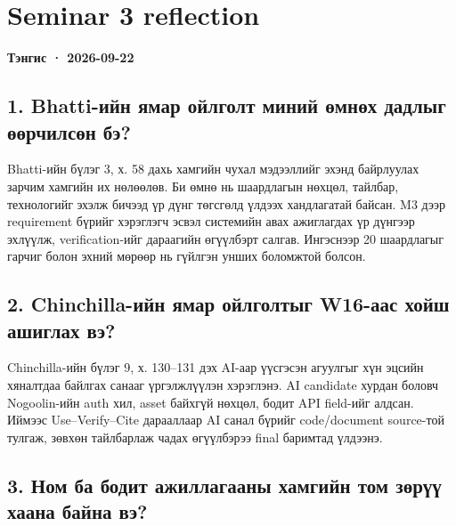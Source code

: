 \documentclass[
  mongolian,
]{article}
\begin{document}
\newpage

\section{Seminar 3 reflection}\label{seminar-3-reflection}

\textbf{Тэнгис · 2026-09-22}

\subsection{1. Bhatti-ийн ямар ойлголт миний өмнөх дадлыг өөрчилсөн
бэ?}\label{bhatti-ux438ux439ux43d-ux44fux43cux430ux440-ux43eux439ux43bux433ux43eux43bux442-ux43cux438ux43dux438ux439-ux4e9ux43cux43dux4e9ux445-ux434ux430ux434ux43bux44bux433-ux4e9ux4e9ux440ux447ux438ux43bux441ux4e9ux43d-ux431ux44d}

Bhatti-ийн бүлэг 3, х. 58 дахь хамгийн чухал мэдээллийг эхэнд байрлуулах
зарчим хамгийн их нөлөөлөв. Би өмнө нь шаардлагын нөхцөл, тайлбар,
технологийг эхэлж бичээд үр дүнг төгсгөлд үлдээх хандлагатай байсан. M3
дээр requirement бүрийг хэрэглэгч эсвэл системийн авах ажиглагдах үр
дүнгээр эхлүүлж, verification-ийг дараагийн өгүүлбэрт салгав. Ингэснээр
20 шаардлагыг гарчиг болон эхний мөрөөр нь гүйлгэн унших боломжтой
болсон.

\subsection{2. Chinchilla-ийн ямар ойлголтыг W16-аас хойш ашиглах
вэ?}\label{chinchilla-ux438ux439ux43d-ux44fux43cux430ux440-ux43eux439ux43bux433ux43eux43bux442ux44bux433-w16-ux430ux430ux441-ux445ux43eux439ux448-ux430ux448ux438ux433ux43bux430ux445-ux432ux44d}

Chinchilla-ийн бүлэг 9, х. 130--131 дэх AI-аар үүсгэсэн агуулгыг хүн
эцсийн хяналтдаа байлгах санааг үргэлжлүүлэн хэрэглэнэ. AI candidate
хурдан боловч Nogoolin-ийн auth хил, asset байхгүй нөхцөл, бодит API
field-ийг алдсан. Иймээс Use--Verify--Cite дарааллаар AI санал бүрийг
code/document source-той тулгаж, зөвхөн тайлбарлаж чадах өгүүлбэрээ
final баримтад үлдээнэ.

\subsection{3. Ном ба бодит ажиллагааны хамгийн том зөрүү хаана байна
вэ?}\label{ux43dux43eux43c-ux431ux430-ux431ux43eux434ux438ux442-ux430ux436ux438ux43bux43bux430ux433ux430ux430ux43dux44b-ux445ux430ux43cux433ux438ux439ux43d-ux442ux43eux43c-ux437ux4e9ux440ux4afux4af-ux445ux430ux430ux43dux430-ux431ux430ux439ux43dux430-ux432ux44d}
\end{document}
